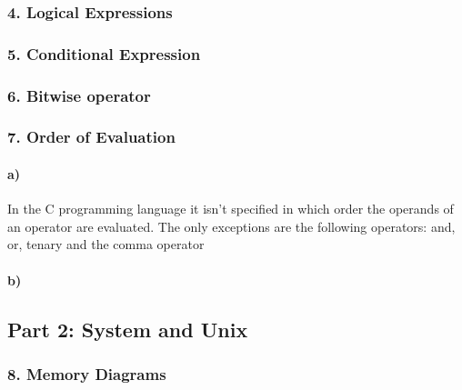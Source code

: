 \documentclass[12pt]{article}
\begin{document}
\subsubsection*{4. Logical Expressions}

\subsubsection*{5. Conditional Expression}

\subsubsection*{6. Bitwise operator}

\subsubsection*{7. Order of Evaluation}
\paragraph{a)}
In the C programming language it isn't specified in which order the operands of an operator are evaluated. The only exceptions are the following operators: and, or, tenary and the comma operator

\paragraph{b)} 

\subsection*{Part 2: System and Unix}
\subsubsection*{8. Memory Diagrams}
\end{document}
